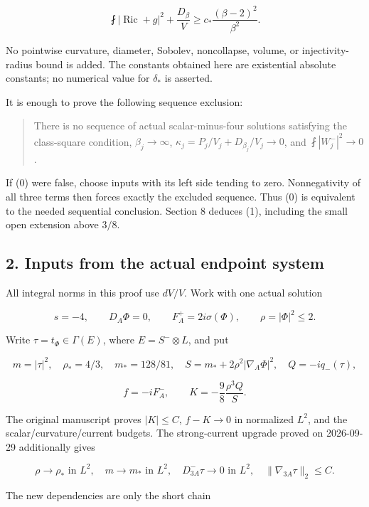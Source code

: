\[
 \boxed{\fint|\operatorname{Ric}+g|^2+\frac{D_\beta}V
       \ge c_*\frac{(\beta-2)^2}{\beta^2}.}\tag{1}
\]

No pointwise curvature, diameter, Sobolev, noncollapse, volume, or
injectivity-radius bound is added. The constants obtained here are
existential absolute constants; no numerical value for \(\delta_*\) is
asserted.

It is enough to prove the following sequence exclusion:

\begin{quote}
There is no sequence of actual scalar-minus-four solutions satisfying
the class-square condition, \(\beta_j\to\infty\),
\(\kappa_j=P_j/V_j+D_{\beta_j}/V_j\to0\), and \(\fint|W_j^-|^2\to0\).
\end{quote}

If (0) were false, choose inputs with its left side tending to zero.
Nonnegativity of all three terms then forces exactly the excluded
sequence. Thus (0) is equivalent to the needed sequential conclusion.
Section 8 deduces (1), including the small open extension above \(3/8\).

\hypertarget{o10critical:inputs-from-the-actual-endpoint-system}{%
\subsection{2. Inputs from the actual endpoint
system}\label{o10critical:inputs-from-the-actual-endpoint-system}}

All integral norms in this proof use \(dV/V\). Work with one actual
solution

\[
 s=-4,\qquad D_A\Phi=0,\qquad F_A^+=2i\sigma(\Phi),
 \qquad \rho=|\Phi|^2\le2.
\]

Write \(\tau=t_\Phi\in\Gamma(E)\), where \(E=S^-\otimes L\), and put

\[
 m=|\tau|^2,\quad \rho_*=4/3,\quad m_*=128/81,
 \quad S=m_*+2\rho^2|\nabla_A\Phi|^2,
 \quad Q=-iq_-(\tau),
\]

\[
 f=-iF_A^-,\qquad K=-\frac98\frac{\rho^3Q}{S}.
\]

The original manuscript proves \(|K|\le C\), \(f-K\to0\) in normalized
\(L^2\), and the scalar/curvature/current budgets. The strong-current
upgrade proved on 2026-09-29 additionally gives

\[
 \rho\to\rho_*\text{ in }L^2,\quad
 m\to m_*\text{ in }L^2,\quad
 D^-_{3A}\tau\to0\text{ in }L^2,\quad
 \|\nabla_{3A}\tau\|_2\le C.
\tag{2}
\]

The new dependencies are only the short chain

